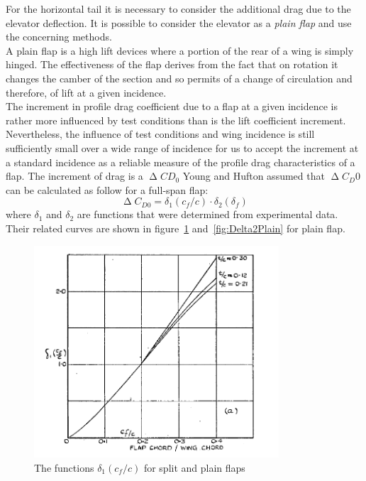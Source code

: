 For the horizontal tail it is necessary to consider the additional drag due to the elevator deflection. It is possible to consider the elevator as a {\itshape plain flap} and use the concerning methods. \\
A plain flap is a high lift devices where a portion of the rear of a wing is simply hinged. The effectiveness of the flap derives from the fact that on rotation it changes the camber of the section and so permits of a change of circulation and therefore, of lift at a given incidence. \\
The increment in profile drag coefficient due to a flap at a given incidence is rather more influenced by test conditions than is the lift coefficient
increment. Nevertheless, the influence of test conditions and wing incidence is still sufficiently small over a wide range of incidence for us to accept the increment at a standard incidence as a reliable measure of the profile drag characteristics of a flap. \cite{Young:Flaps} The increment of drag is a $\upDelta CD_0$
Young and Hufton assumed that  $\upDelta C_D0$ can be calculated as follow for a full-span flap:
%
\begin{equation}
\upDelta C_{D0}=\delta_1\left(c_f/c\right)\cdot\delta_2\left(\delta_f\right)
\label{eqn:DeltaCD0FullSpan}
\end{equation}
%
where $\delta_1$ and $\delta_2$ are functions that were determined from experimental data. Their related curves are shown in figure~\ref{fig:Delta1Plain} and~\ref{fig:Delta2Plain} for plain flap.
%
\begin{figure}[H]
\centering
\includegraphics[height=7.9cm]{Immagini/Delta1_Plain}
\caption{The functions $\delta_1\left(c_f/c\right)$ for split and plain flaps}
\label{fig:Delta1Plain}
\end{figure}
%
